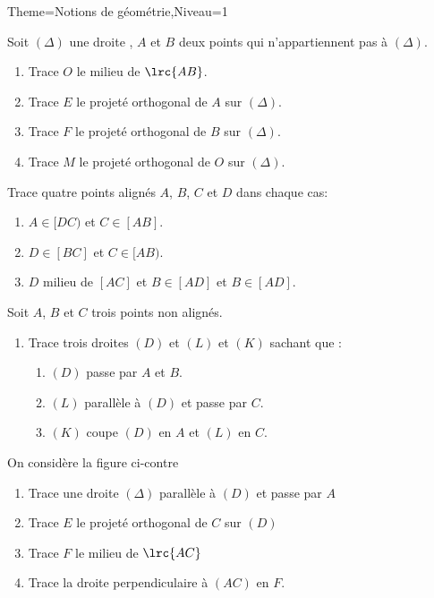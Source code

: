 \documentclass[a4paper,12pt]{article}
\begin{document}
\begin{Maquette}[Fiche]{Theme=Notions de géométrie,Niveau=1}
\begin{exercice}
Soit $(\Delta)$ une droite , $A$ et $B$ deux points qui n'appartiennent pas à $(\Delta)$.
\begin{enumerate}
\item Trace $O$ le milieu de $\lrc{AB}$.
\item Trace $E$ le projeté orthogonal de $A$ sur $(\Delta)$.
\item Trace $F$ le projeté orthogonal de $B$ sur $(\Delta)$.
\item Trace $M$ le projeté orthogonal de $O$ sur $(\Delta)$.
\end{enumerate}
\end{exercice}

\begin{exercice}
Trace quatre points alignés $A$, $B$, $C$ et $D$ dans chaque cas:
\begin{enumerate}
\item $A\in [DC)$ et $C\in [AB]$.
\item $D\in [BC]$ et $C\in [AB)$.
\item $D$ milieu de $[AC]$ et $B\in [AD]$ et $B\in [AD]$.
\end{enumerate}
\end{exercice}

\begin{exercice}
Soit $A$, $B$ et $C$ trois points non alignés.
\begin{enumerate}
\item Trace trois droites $(D)$ et $(L)$ et $(K)$ sachant que :
\begin{enumerate}
\item $(D)$ passe par $A$ et $B$.
\item $(L)$ parallèle à $(D)$ et passe par $C$.
\item $(K)$ coupe  $(D)$ en $A$ et  $(L)$ en $C$.
\end{enumerate}
\end{enumerate}
\end{exercice}

\begin{exercice}
\begin{minipage}{0.6\linewidth}
On considère la figure ci-contre 
\begin{enumerate}
\item Trace une droite $(\Delta)$ parallèle à $(D)$ et passe par $A$
\item Trace $E$ le projeté orthogonal de $C$ sur $(D)$
\item Trace $F$ le milieu de $\lrc{AC}$
\item Trace la droite perpendiculaire à $(AC)$ en $F$.
\end{enumerate}
\end{minipage}%
\begin{minipage}{0.4\linewidth}
\end{minipage}
\end{exercice}


\end{Maquette}
\end{document}

